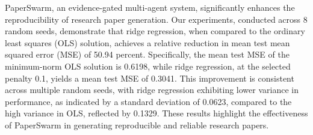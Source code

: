 PaperSwarm, an evidence-gated multi-agent system, significantly enhances the reproducibility of research paper generation. Our experiments, conducted across 8 random seeds, demonstrate that ridge regression, when compared to the ordinary least squares (OLS) solution, achieves a relative reduction in mean test mean squared error (MSE) of 50.94 percent. Specifically, the mean test MSE of the minimum-norm OLS solution is 0.6198, while ridge regression, at the selected penalty 0.1, yields a mean test MSE of 0.3041. This improvement is consistent across multiple random seeds, with ridge regression exhibiting lower variance in performance, as indicated by a standard deviation of 0.0623, compared to the high variance in OLS, reflected by 0.1329. These results highlight the effectiveness of PaperSwarm in generating reproducible and reliable research papers.
